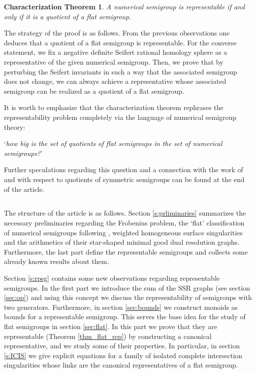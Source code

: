 \documentclass[oneside]{amsart}
\numberwithin{equation}{section}
\numberwithin{equation}{subsection}
\theoremstyle{plain}
\newtheorem*{chtheorem}{Characterization Theorem}
\theoremstyle{definition}
\begin{document}
\begin{chtheorem}
A numerical semigroup is representable if and only if it is a quotient of a flat semigroup.  
\end{chtheorem}

The strategy of the proof is as follows. From the previous observations one deduces that a quotient of a flat semigroup is representable. For the converse statement, we fix a negative definite Seifert rational homology sphere as a representative of the given numerical semigroup. Then, we prove that by perturbing the Seifert invariants in such a way that the associated semigroup does not change, we can always achieve a representative whose associated semigroup can be realized as a quotient of a flat semigroup.

\vspace{0.2cm}
It is worth to emphasize that the characterization theorem rephrases the representability problem completely via the language of numerical semigroup theory: 
\begin{center}
`{\it how big is the set of quotients of flat semigroups in the set of numerical semigroups?}' 
\end{center}
Further speculations regarding this question and a connection with the work of \cite{symmhalf} and \cite{symmquotient} with respect to quotients of symmetric semigroups can be found at the end of the article. 

\subsection{} The structure of the article is as follows. Section \ref{s:prliminaries} summarizes the necessary  preliminaries regarding the Frobenius problem, the `flat'  classification of numerical semigroups following  \cite{art_rch}, weighted homogeneous surface singularities and the arithmetics of their star-shaped minimal good dual resolution graphs. Furthermore, the last part define the representable semigroups and collects some already known results about them.   

Section \ref{s:rpsg} contains some new observations regarding representable semigroups. In the first part we introduce the sum of the SSR graphs (see section \ref{sec:op}) and using this concept we discuss the representability of semigroups with two generators. Furthermore, in section \ref{sec:bounds} we construct monoids as bounds for a representable semigroup. This serves the base idea for the study of flat semigroups in section \ref{sec:flat}. In this part we prove that they are representable (Theorem \ref{thm_flat_rep}) by constructing a canonical representative, and we study some of their properties. In particular, in section \ref{s:ICIS} we give explicit equations for a family of isolated complete intersection singularities whose links are the canonical representatives of a flat semigroup. 
\end{document}
